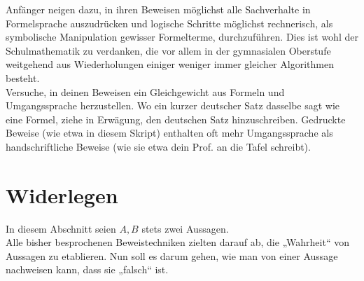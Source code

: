  
 


\begin{bem}
 Anfänger neigen dazu, in ihren Beweisen möglichst alle Sachverhalte in Formelsprache auszudrücken und logische Schritte möglichst rechnerisch, als symbolische Manipulation gewisser Formelterme, durchzuführen. Dies ist wohl der Schulmathematik zu verdanken, die vor allem in der gymnasialen Oberstufe weitgehend aus Wiederholungen einiger weniger immer gleicher Algorithmen besteht. \\
 Versuche, in deinen Beweisen ein Gleichgewicht aus Formeln und Umgangssprache herzustellen. Wo ein kurzer deutscher Satz dasselbe sagt wie eine Formel, ziehe in Erwägung, den deutschen Satz hinzuschreiben. Gedruckte Beweise (wie etwa in diesem Skript) enthalten oft mehr Umgangssprache als handschriftliche Beweise (wie sie etwa dein Prof. an die Tafel schreibt).
\end{bem}








\section{Widerlegen}
In diesem Abschnitt seien $A,B$ stets zwei Aussagen. \\
Alle bisher besprochenen Beweistechniken zielten darauf ab, die „Wahrheit“ von Aussagen zu etablieren. Nun soll es darum gehen, wie man von einer Aussage nachweisen kann, dass sie „falsch“ ist.


